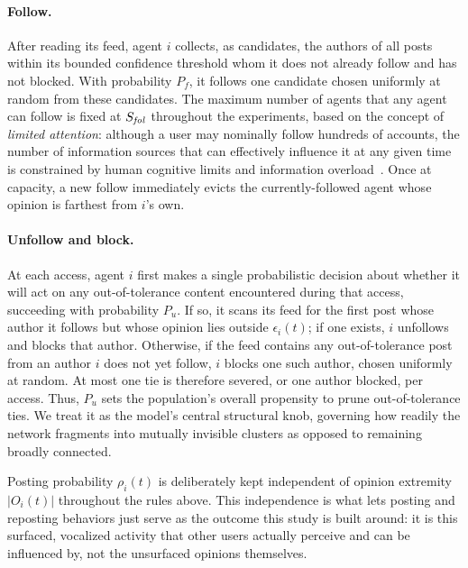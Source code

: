 \documentclass{svproc}
\def\post{\rho}                 %
\def\BoundedConfidence{\epsilon} %
\def\maxfollower{S_{\it fol}}    %
\begin{document}
\paragraph{Follow.} 
After reading its feed, agent $i$ collects, 
as candidates, the authors of all posts within 
its bounded confidence threshold whom it does not 
already follow and has not blocked. 
With probability $P_f$, it follows one candidate 
chosen uniformly at random from these candidates. 
The maximum number of agents that any agent can
follow is fixed at $\maxfollower$ throughout the
experiments, based on the concept of \emph{limited
attention}: although a user may nominally follow
hundreds of accounts, the number of information
sources that can effectively influence it at any
given time is constrained by human cognitive limits
and information overload~\cite{goncalves2011,weng2012}.
Once at capacity, a new follow immediately evicts 
the currently-followed agent whose opinion is 
farthest from $i$'s own.

\paragraph{Unfollow and block.} 
At each access, agent $i$ first makes a single
probabilistic decision about whether
it will act on any out-of-tolerance content
encountered during that access, succeeding with probability $P_u$.
If so, it scans its feed for the first post whose 
author it follows but whose opinion lies outside 
$\BoundedConfidence_i(t)$; if one exists, $i$ 
unfollows and blocks that author. 
Otherwise, if the feed contains any 
out-of-tolerance post from an author $i$ does not 
yet follow, $i$ blocks one such author, chosen 
uniformly at random. At most one tie is therefore 
severed, or one author blocked, per access. Thus,
$P_u$ sets the population's overall propensity
to prune out-of-tolerance ties. We treat
it as the model's central structural knob,
governing how readily the network fragments
into mutually invisible clusters as opposed
to remaining broadly connected.

Posting probability $\post_i(t)$ is deliberately
kept independent of opinion extremity $|O_i(t)|$
throughout the rules above. 
This independence is what lets posting and reposting 
behaviors just serve as the outcome this study is
built around: it is this surfaced, vocalized
activity that other users actually perceive and
can be influenced by, not the unsurfaced opinions
themselves.
\end{document}
